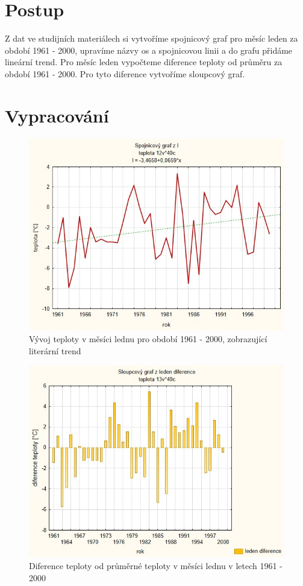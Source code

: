 \documentclass{article}
\begin{document}
 	 	
	 		
	 	\section*{Postup} %
	 	
	 			
		Z dat ve studijních materiálech si vytvoříme spojnicový graf pro měsíc leden za období 1961 - 2000, upravíme  názvy os a spojnicovou linii a do grafu přidáme lineární trend. Pro měsíc leden vypočteme diference teploty od průměru za období 1961 - 2000. Pro tyto diference vytvoříme sloupcový graf.
		
		\section*{Vypracování}

	\begin{figure}[h]
	\centering
	\includegraphics[width=0.9\linewidth]{Stats1.jpg}
	\caption{Vývoj teploty v měsíci lednu pro období 1961 - 2000, zobrazující literární trend}
	\label{fig:GrafinStats1}
	\end{figure}

\begin{figure}
\centering
\includegraphics[width=0.9\linewidth]{GrafinPS1}
\caption{Diference teploty od průměrné teploty v měsíci lednu v letech 1961 - 2000}
\label{fig:GrafinPS1}
\end{figure}


	
	
\end{document}
